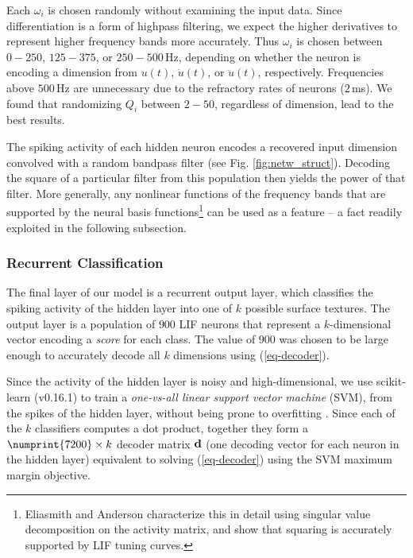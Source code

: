 Each $\omega_i$ %
is chosen randomly without examining the input data. Since differentiation is a form of highpass filtering, we expect the higher derivatives to represent higher frequency bands more accurately. Thus $\omega_i$ is chosen between $0 - 250$, $125 - 375$, or $250 - 500$\,Hz, depending on whether the neuron is encoding a dimension from $u(t)$, $\dot{u}(t)$, or $\ddot{u}(t)$, respectively. Frequencies above $500$\,Hz are unnecessary due to the refractory rates of neurons ($2$\,ms). We found that randomizing $Q_i$ between $2 - 50$, regardless of dimension, lead to the best results. 

The spiking activity of each hidden neuron encodes a recovered input dimension convolved with a random bandpass filter (see Fig. \ref{fig:netw_struct}). Decoding the square of a particular filter from this population then yields the power of that filter. More generally, any nonlinear functions of the frequency bands that are supported by the neural basis functions\footnote{Eliasmith and Anderson \cite{eliasmith2003a} characterize this in detail using singular value decomposition on the activity matrix, and show that squaring is accurately supported by LIF tuning curves.} can be used as a feature -- a fact readily exploited in  the following subsection.

\subsubsection{Recurrent Classification}

\newcommand{\outputNeurons}{900}

The final layer of our model is a recurrent output layer,  which classifies the spiking activity of the hidden layer into one of $k$ possible surface textures. The output layer is a population of $\outputNeurons{}$ LIF neurons that represent a $k$-dimensional vector %
encoding a {\it score} for each class. The value of $\outputNeurons{}$ was chosen to be large enough to accurately decode all $k$ dimensions using (\ref{eq-decoder}).

Since the activity of the hidden layer is noisy and high-dimensional, we use scikit-learn (v0.16.1) to train a {\it one-vs-all linear support vector machine} (SVM), from the spikes of the hidden layer, without being prone to overfitting  \cite{pedregosa2011scikit}. Since each of the $k$ classifiers  computes a dot product, together they form a $\numprint{7200} \times k$ decoder matrix $\mathbf{d}$ (one decoding vector for each neuron in the hidden layer)  equivalent to solving (\ref{eq-decoder}) using the SVM maximum margin objective.

